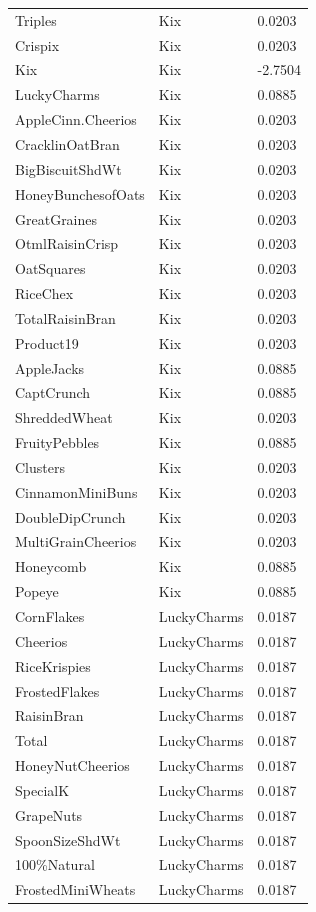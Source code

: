 \begin{table}[!htbp]
\begin{tabular}{lll}
Triples & Kix & 0.0203
\\
Crispix & Kix & 0.0203
\\
Kix & Kix & -2.7504
\\
LuckyCharms & Kix & 0.0885
\\
AppleCinn.Cheerios & Kix & 0.0203
\\
CracklinOatBran & Kix & 0.0203
\\
BigBiscuitShdWt & Kix & 0.0203
\\
HoneyBunchesofOats & Kix & 0.0203
\\
GreatGraines & Kix & 0.0203
\\
OtmlRaisinCrisp & Kix & 0.0203
\\
OatSquares & Kix & 0.0203
\\
RiceChex & Kix & 0.0203
\\
TotalRaisinBran & Kix & 0.0203
\\
Product19 & Kix & 0.0203
\\
AppleJacks & Kix & 0.0885
\\
CaptCrunch & Kix & 0.0885
\\
ShreddedWheat & Kix & 0.0203
\\
FruityPebbles & Kix & 0.0885
\\
Clusters & Kix & 0.0203
\\
CinnamonMiniBuns & Kix & 0.0203
\\
DoubleDipCrunch & Kix & 0.0203
\\
MultiGrainCheerios & Kix & 0.0203
\\
Honeycomb & Kix & 0.0885
\\
Popeye & Kix & 0.0885
\\
CornFlakes & LuckyCharms & 0.0187
\\
Cheerios & LuckyCharms & 0.0187
\\
RiceKrispies & LuckyCharms & 0.0187
\\
FrostedFlakes & LuckyCharms & 0.0187
\\
RaisinBran & LuckyCharms & 0.0187
\\
Total & LuckyCharms & 0.0187
\\
HoneyNutCheerios & LuckyCharms & 0.0187
\\
SpecialK & LuckyCharms & 0.0187
\\
GrapeNuts & LuckyCharms & 0.0187
\\
SpoonSizeShdWt & LuckyCharms & 0.0187
\\
100\%Natural & LuckyCharms & 0.0187
\\
FrostedMiniWheats & LuckyCharms & 0.0187
\\

\end{tabular}
\end{table}
